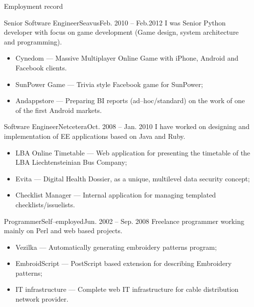 \documentclass[]{mcdowellcv}
\begin{document}
\begin{cvsection}{Employment record}
		\begin{cvsubsection}{Senior Software Engineer}{Seavus}{Feb. 2010 -- Feb.2012}
			I was Senior Python developer with focus on game development (Game design, system architecture and programming).
			\begin{itemize}
				\item Cynedom --- Massive Multiplayer Online Game with iPhone, Android and Facebook clients.
				\item SunPower Game  --- Trivia style Facebook game for SunPower;
				\item Andappstore --- Preparing BI reports (ad--hoc/standard) on the work of one of the first Android markets.
			\end{itemize}
		\end{cvsubsection}

		\begin{cvsubsection}{Software Engineer}{Netcetera}{Oct. 2008 -- Jan. 2010}
            I have worked on designing and implementation of EE applications based on Java and Ruby.
			\begin{itemize}
				\item LBA Online Timetable --- Web application for presenting the timetable of the LBA Liechtensteinian Bus Company;
				\item Evita --- Digital Health Dossier, as a unique, multilevel data security concept;
				\item Checklist Manager --- Internal application for managing templated checklists/issuelists.
			\end{itemize}
		\end{cvsubsection}

		\begin{cvsubsection}{Programmer}{Self--employed}{Jun. 2002 -- Sep. 2008}
            Freelance programmer working mainly on Perl and web based projects.
			\begin{itemize}
				\item Vezilka --- Automatically generating embroidery patterns program;
				\item EmbroidScript --- PostScript based extension for describing Embroidery patterns;
				\item IT infrastructure --- Complete web IT infrastructure for cable distribution network provider.
			\end{itemize}
		\end{cvsubsection}
	\end{cvsection}
\end{document}
